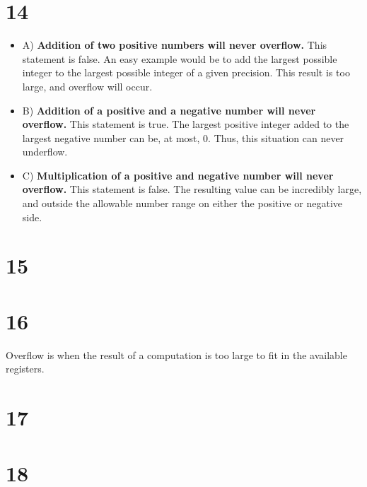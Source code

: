 \documentclass[a4paper,11pt]{article}
\begin{document}
\section*{14}
\begin{itemize}
  \item A) {\bf Addition of two positive numbers will never overflow.}  This statement is false.  An easy example would be to add the largest possible integer to the largest possible integer of a given precision.  This result is too large, and overflow will occur.
  \item B) {\bf Addition of a positive and a negative number will never overflow.}  This statement is true.  The largest positive integer added to the largest negative number can be, at most, 0.  Thus, this situation can never underflow.
  \item C) {\bf Multiplication of a positive and negative number will never overflow.}  This statement is false.  The resulting value can be incredibly large, and outside the allowable number range on either the positive or negative side.
\end{itemize}


\section*{15}


\section*{16}
Overflow is when the result of a computation is too large to fit in the available registers. 


\section*{17}


\section*{18}

\end{document}
